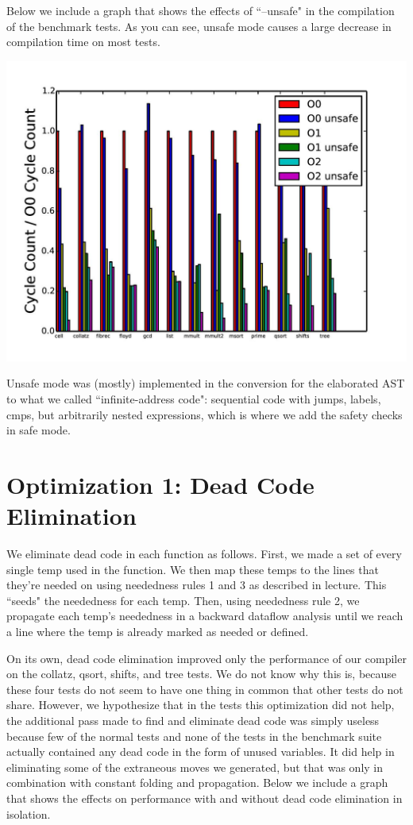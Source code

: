 \documentclass{article}
\begin{document}
Below we include a graph that shows the effects of ``--unsafe" in the compilation of the benchmark tests. As you can see, unsafe mode causes a large decrease in compilation time on most tests. 

\includegraphics[scale=0.5]{everything-page-001}

Unsafe mode was (mostly) implemented in the conversion for the elaborated AST to what we called ``infinite-address code": sequential code with jumps, labels, cmps, but arbitrarily nested expressions, which is where we add the safety checks in safe mode.

\section{Optimization 1: Dead Code Elimination}

We eliminate dead code in each function as follows. First, we made a set of every single temp used in the function. We then map these temps to the lines that they're needed on using neededness rules 1 and 3 as described in lecture. This ``seeds" the neededness for each temp. Then, using neededness rule 2, we propagate each temp's neededness in a backward dataflow analysis until we reach a line where the temp is already marked as needed or defined. 

On its own, dead code elimination improved only the performance of our compiler on the collatz, qsort, shifts, and tree tests. We do not know why this is, because these four tests do not seem to have one thing in common that other tests do not share. However, we hypothesize that in the tests this optimization did not help, the additional pass made to find and eliminate dead code was simply useless because few of the normal tests and none of the tests in the benchmark suite actually contained any dead code in the form of unused variables. It did help in eliminating some of the extraneous moves we generated, but that was only in combination with constant folding and propagation. Below we include a graph that shows the effects on performance with and without dead code elimination in isolation.
\end{document}
